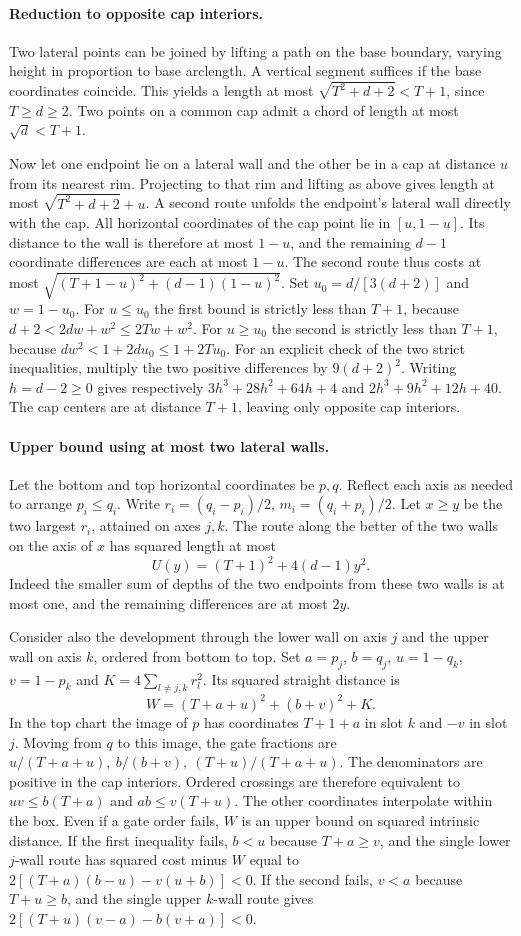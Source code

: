 \documentclass[10pt,letterpaper]{article}
\begin{document}
\paragraph{Reduction to opposite cap interiors.}
Two lateral points can be joined by lifting a path on the base boundary,
varying height in proportion to base arclength. A vertical segment suffices
if the base coordinates coincide. This yields a length at most
$\sqrt{T^2+d+2}<T+1$, since $T\ge d\ge2$. Two points on a common cap
admit a chord of length at most $\sqrt d<T+1$.

Now let one endpoint lie on a lateral wall and the other be in a cap
at distance $u$ from its nearest rim. Projecting to that rim and lifting
as above gives length at most $\sqrt{T^2+d+2}+u$. A second route
unfolds the endpoint's lateral wall directly with the cap. All horizontal
coordinates of the cap point lie in $[u,1-u]$. Its distance to the wall
is therefore at most $1-u$, and the remaining $d-1$ coordinate differences
are each at most $1-u$. The second route thus costs at most
$\sqrt{(T+1-u)^2+(d-1)(1-u)^2}$.
Set $u_0=d/[3(d+2)]$ and $w=1-u_0$. For $u\le u_0$ the first bound is
strictly less than $T+1$, because $d+2<2dw+w^2\le2Tw+w^2$.
For $u\ge u_0$ the second is strictly less than $T+1$, because
$dw^2<1+2du_0\le1+2Tu_0$. For an explicit check of the two strict
inequalities, multiply the two positive differences by $9(d+2)^2$.
Writing $h=d-2\ge0$ gives respectively
$3h^3+28h^2+64h+4$ and $2h^3+9h^2+12h+40$.
The cap centers are at distance $T+1$, leaving only opposite cap interiors.

\paragraph{Upper bound using at most two lateral walls.}
Let the bottom and top horizontal coordinates be $p,q$. Reflect each
axis as needed to arrange $p_i\le q_i$. Write $r_i=(q_i-p_i)/2$,
$m_i=(q_i+p_i)/2$. Let $x\ge y$ be the two largest $r_i$, attained
on axes $j,k$. The route along the better of the two walls on the axis
of $x$ has squared length at most
\[
 U(y)=(T+1)^2+4(d-1)y^2.
\]
Indeed the smaller sum of depths of the two endpoints from these two
walls is at most one, and the remaining differences are at most $2y$.

Consider also the development through the lower wall on axis $j$ and
the upper wall on axis $k$, ordered from bottom to top. Set
$a=p_j$, $b=q_j$, $u=1-q_k$, $v=1-p_k$ and
$K=4\sum_{l\ne j,k}r_l^2$. Its squared straight distance is
\[
 W=(T+a+u)^2+(b+v)^2+K.
\]
In the top chart the image of $p$ has coordinates $T+1+a$ in slot
$k$ and $-v$ in slot $j$. Moving from $q$ to this image, the gate
fractions are $u/(T+a+u),\ b/(b+v),\ (T+u)/(T+a+u)$.
The denominators are positive in the cap interiors. Ordered crossings
are therefore equivalent to $uv\le b(T+a)$ and $ab\le v(T+u)$.
The other coordinates interpolate within the box. Even if a gate order
fails, $W$ is an upper bound on squared intrinsic distance. If the
first inequality fails, $b<u$ because $T+a\ge v$, and the single lower $j$-wall route has squared
cost minus $W$ equal to
$2[(T+a)(b-u)-v(u+b)]<0$. If the second fails, $v<a$ because $T+u\ge b$, and the single upper
$k$-wall route gives $2[(T+u)(v-a)-b(v+a)]<0$.
\end{document}

